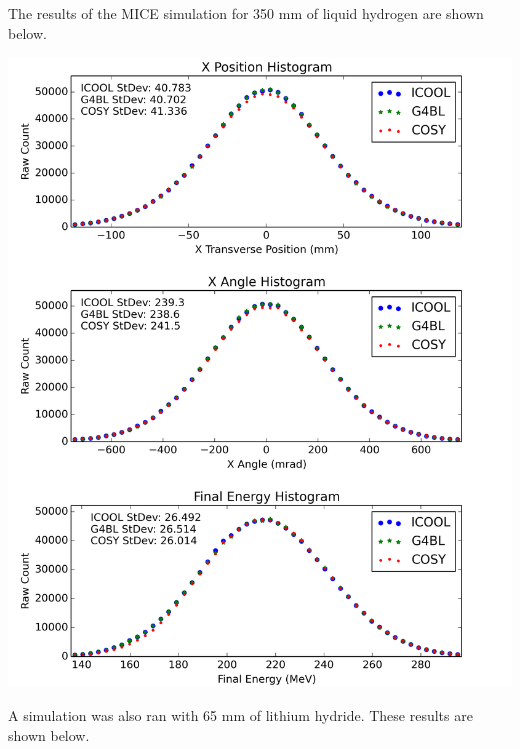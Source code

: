 \documentclass[portrait,a0paper,fontscale=0.285]{baposter} %
\begin{document}
\begin{poster}
{
The results of the MICE simulation for 350 mm of liquid hydrogen are shown below.
\begin{center}
\includegraphics[width=\textwidth]{Figures/MICE_LH}
\end{center}

A simulation was also ran with 65 mm of lithium hydride. These results are shown below.

}
\end{poster}
\end{document}
